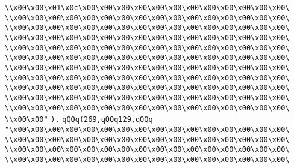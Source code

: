 \verb|\\x00\x00\x01\x0c\x00\x00\x00\x00\x00\x00\x00\x00\x00\x00\x00\x00\|\newline
\verb|\\x00\x00\x00\x00\x00\x00\x00\x00\x00\x00\x00\x00\x00\x00\x00\x00\|\newline
\verb|\\x00\x00\x00\x00\x00\x00\x00\x00\x00\x00\x00\x00\x00\x00\x00\x00\|\newline
\verb|\\x00\x00\x00\x00\x00\x00\x00\x00\x00\x00\x00\x00\x00\x00\x00\x00\|\newline
\verb|\\x00\x00\x00\x00\x00\x00\x00\x00\x00\x00\x00\x00\x00\x00\x00\x00\|\newline
\verb|\\x00\x00\x00\x00\x00\x00\x00\x00\x00\x00\x00\x00\x00\x00\x00\x00\|\newline
\verb|\\x00\x00\x00\x00\x00\x00\x00\x00\x00\x00\x00\x00\x00\x00\x00\x00\|\newline
\verb|\\x00\x00\x00\x00\x00\x00\x00\x00\x00\x00\x00\x00\x00\x00\x00\x00\|\newline
\verb|\\x00\x00\x00\x00\x00\x00\x00\x00\x00\x00\x00\x00\x00\x00\x00\x00\|\newline
\verb|\\x00\x00\x00\x00\x00\x00\x00\x00\x00\x00\x00\x00\x00\x00\x00\x00\|\newline
\verb|\\x00\x00\x00\x00\x00\x00\x00\x00\x00\x00\x00\x00\x00\x00\x00\x00\|\newline
\verb|\\x00\x00"|\newline
\verb|),|\newline
\verb|qQQq(269,qQQq129,qQQq|\newline
\verb|"\x00\x00\x00\x00\x00\x00\x00\x00\x00\x00\x00\x00\x00\x00\x00\x00\|\newline
\verb|\\x00\x00\x00\x00\x00\x00\x00\x00\x00\x00\x00\x00\x00\x00\x00\x00\|\newline
\verb|\\x00\x00\x00\x00\x00\x00\x00\x00\x00\x00\x00\x00\x00\x00\x00\x00\|\newline
\verb|\\x00\x00\x00\x00\x00\x00\x00\x00\x00\x00\x00\x00\x00\x00\x00\x00\|\newline
